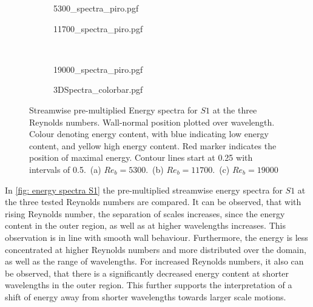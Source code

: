 \begin{figure}[h!]
    \centering
    \begin{subfigure}{0.495\textwidth}
        \subcaption{}
        {5300_spectra_piro.pgf}
        \label{subfig: 5300 spectra piro Reynolds comp}
    \end{subfigure}
    \hfill
        \begin{subfigure}{0.495\textwidth}
            \subcaption{}
            {11700_spectra_piro.pgf}
            \label{subfig: 11700 spectra piro Reynolds comp}
    \end{subfigure}
    \\[-20pt]
    \begin{subfigure}{0.495\textwidth}
        \subcaption{}
        {19000_spectra_piro.pgf}
        \label{subfig: 19000 spectra piro Reynolds comp}
    \end{subfigure}
    \centering
    \begin{subfigure}{\textwidth}
        \centering
        \hspace{0.9cm}
        {3DSpectra_colorbar.pgf}
    \end{subfigure}
    \caption[Streamwise pre-multiplied energy spectra for $S1$]{Streamwise pre-multiplied Energy spectra for $S1$ at the three Reynolds numbers. Wall-normal position plotted over wavelength. Colour denoting energy content, with blue indicating low energy content, and yellow high energy content. Red marker indicates the position of maximal energy. Contour lines start at 0.25 with intervals of 0.5.~(a) $Re_b = 5300$.~(b) $Re_b = 11700$.~(c) $Re_b = 19000$}
    \label{fig: energy spectra S1}
\end{figure}
In \autoref{fig: energy spectra S1} the pre-multiplied streamwise energy spectra for $S1$ at the three tested Reynolds numbers are compared.
It can be observed, that with rising Reynolds number, the separation of scales increases, since the energy content in the outer region, as well as at higher wavelengths increases.
This observation is in line with smooth wall behaviour.
Furthermore, the energy is less concentrated at higher Reynolds numbers and more distributed over the domain, as well as the range of wavelengths.
For increased Reynolds numbers, it also can be observed, that there is a significantly decreased energy content at shorter wavelengths in the outer region.
This further supports the interpretation of a shift of energy away from shorter wavelengths towards larger scale motions. 
